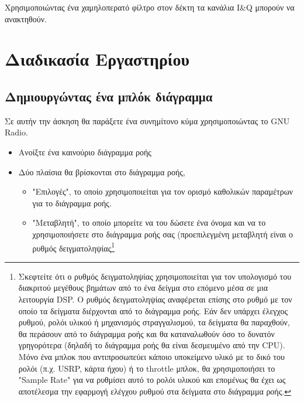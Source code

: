 \documentclass[12pt]{report}
\begin{document}
        Χρησιμοποιώντας ένα χαμηλοπερατό φίλτρο στον δέκτη τα κανάλια I\&Q μπορούν να ανακτηθούν.

    \section{\textsf{Διαδικασία Εργαστηρίου}}
        \subsection{\textsf{Δημιουργώντας ένα μπλόκ διάγραμμα}}

            Σε αυτήν την άσκηση θα παράξετε ένα συνημίτονο κύμα χρησιμοποιώντας το GNU Radio.

            \begin{itemize}
                \item Ανοίξτε ένα καινούριο διάγραμμα ροής
                \item Δύο πλαίσια θα βρίσκονται στο διάγραμμα ροής,
                    \begin{itemize}
                        \item "Επιλογές", το οποίο χρησιμοποιείται για τον ορισμό καθολικών παραμέτρων
                        για το διάγραμμα ροής.
                        \item "Μεταβλητή", το οποίο μπορείτε να του δώσετε ένα όνομα και να 
                        το χρησιμοποιήσετε στο διάγραμμα ροής σας (προεπιλεγμένη μεταβλητή είναι 
                        ο ρυθμός δειγματοληψίας\footnote{
                            Σκεφτείτε ότι ο ρυθμός δειγματοληψίας χρησιμοποιείται για τον υπολογισμό του 
                            διακριτού μεγέθους βημάτων από το ένα δείγμα στο επόμενο μέσα σε μια λειτουργία DSP.
                            Ο ρυθμός δειγματοληψίας αναφέρεται επίσης στο ρυθμό με τον οποίο τα δείγματα
                            διέρχονται από το διάγραμμα ροής. Εάν δεν υπάρχει έλεγχος ρυθμού, ρολόι υλικού ή
                            μηχανισμός στραγγαλισμού, τα δείγματα θα παραχθούν, θα περάσουν από το διάγραμμα 
                            ροής και θα καταναλωθούν όσο το δυνατόν γρηγορότερα (δηλαδή το διάγραμμα ροής θα
                            είναι δεσμευμένο από την CPU). Μόνο ένα μπλοκ που αντιπροσωπεύει κάποιο υποκείμενο
                            υλικό με το δικό του ρολόι (π.χ. USRP, κάρτα ήχου) ή το throttle μπλοκ, θα
                            χρησιμοποιήσει το "Sample Rate" για να ρυθμίσει αυτό το ρολόι υλικού και επομένως 
                            θα έχει ως αποτέλεσμα την εφαρμογή ελέγχου ρυθμού στα δείγματα στο διάγραμμα ροής.
}
\end{itemize}
\end{itemize}
\end{document}
